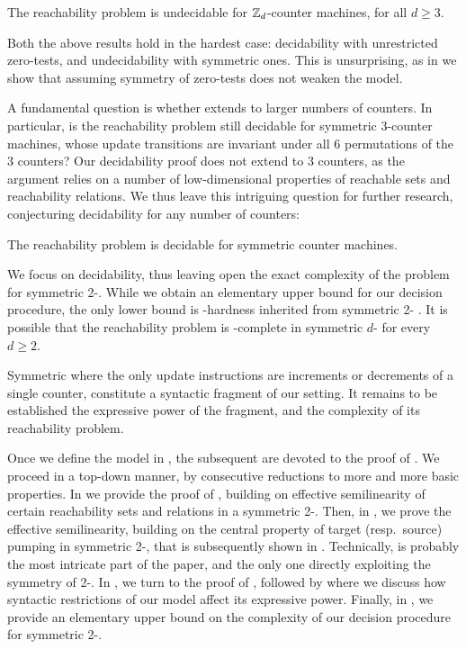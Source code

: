 \begin{theorem} \label{thm:undecid}
The reachability problem  is undecidable for $\mathbb{Z}_{d}$-counter machines,
for all $d \geq 3$.
\end{theorem}
% 
Both the above results hold in the hardest case: decidability with
unrestricted zero-tests, and undecidability with symmetric ones. 
This is unsurprising, as in  we show that assuming
symmetry of zero-tests does not weaken the model.


A fundamental question is whether  extends to larger numbers 
of counters. 
In particular, is the reachability problem still decidable
for symmetric 3-counter machines, whose update transitions are invariant
under all 6 permutations of the 3 counters?
Our decidability proof does not extend to 3 counters, 
as the argument relies on a
number of low-dimensional properties of reachable sets and reachability
relations.
We thus leave this intriguing question for further research, conjecturing
decidability for any number of counters:

\begin{conjecture}
The reachability problem  is decidable for symmetric counter machines.
\end{conjecture}

We focus on decidability, thus
leaving open the exact complexity of the problem for
symmetric 2-.
While we obtain an elementary upper bound for our decision 
procedure,
the only lower bound is
\pspace-hardness inherited from symmetric 2-\vass
\cite{KL25}.
It is possible that the reachability problem is \pspace-complete
in symmetric $d$- for every $d\geq 2$.

Symmetric  where the only update instructions are increments 
or decrements of a single counter, constitute a syntactic fragment of our 
setting. 
It remains to be established the 
expressive power of the fragment, and the complexity of 
its reachability problem.


Once we define the model in , the subsequent
 are devoted to the proof of
.
We proceed in a top-down manner, by consecutive reductions to more and
more basic properties. 
In  we provide the proof of ,
building on effective
semilinearity of certain reachability sets and relations in a
symmetric 2-\cm.
Then, in , we prove the effective semilinearity,
building on the central property of target (resp.~source) pumping
in symmetric 2-\vass, that is subsequently shown in .
Technically,  is probably the most intricate part 
of the paper, and the only one directly exploiting the symmetry of 2-.
In , we turn to the proof of ,
followed by  where we discuss how syntactic restrictions of our model
affect its expressive power.
Finally, in , we provide an elementary upper bound
on the complexity of our decision procedure for symmetric 2-.


